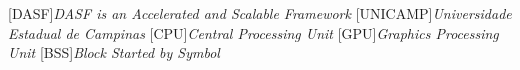 [DASF]{\emph{DASF is an Accelerated and Scalable Framework}}
[UNICAMP]{\emph{Universidade Estadual de Campinas}}
[CPU]{\emph{Central Processing Unit}}
[GPU]{\emph{Graphics Processing Unit}}
[BSS]{\emph{Block Started by Symbol}}
